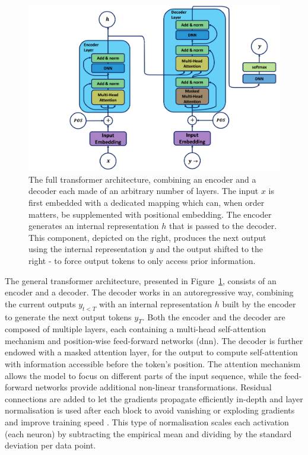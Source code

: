 \begin{figure}[h!]
    \center
    \includegraphics[width=\textwidth]{Images/ML/transformer.png}
    \caption{The full transformer architecture, combining an encoder and a decoder each made of an arbitrary number of layers. The input $x$ is first embedded with a dedicated mapping which can, when order matters, be supplemented with positional embedding. The encoder generates an internal representation $h$ that is passed to the decoder. This component, depicted on the right, produces the next output using the internal representation $y$ and the output shifted to the right - to force output tokens to only access prior information.} 
    \label{fig:tranfoArchi}
\end{figure}

The general transformer architecture, presented in Figure~\ref{fig:tranfoArchi}, consists of an encoder and a decoder. The decoder works in an autoregressive way, combining the current outputs $y_{t<T}$ with an internal representation $h$ built by the encoder to generate the next output tokens $y_{T}$. Both the encoder and the decoder are composed of multiple layers, each containing a multi-head self-attention mechanism and position-wise feed-forward networks (\gls{dnn}). The decoder is further endowed with a masked attention layer, for the output to compute self-attention with information accessible before the token's position. The attention mechanism allows the model to focus on different parts of the input sequence, while the feed-forward networks provide additional non-linear transformations. Residual connections are added to let the gradients propagate efficiently in-depth and layer normalisation is used after each block to avoid vanishing or exploding gradients and improve training speed \cite{ba2016layer}. This type of normalisation scales each activation (each neuron) by subtracting the empirical mean and dividing by the standard deviation per data point. \\

